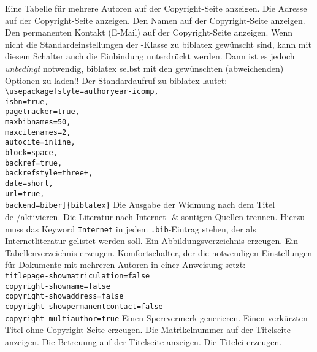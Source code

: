  Eine Tabelle \dfalse für mehrere Autoren auf der Copyright-Seite anzeigen.
 Die Adresse auf der Copyright-Seite anzeigen. \dtrue
{} Den Namen auf der Copyright-Seite anzeigen. \dtrue
{} Den permanenten Kontakt (E-Mail) auf der Copy\-right-Seite anzeigen. \dtrue
{} Wenn nicht \dfalse die Standardeinstellungen der \HSKLbook-Klasse zu biblatex gewünscht sind, kann mit diesem Schalter auch die Einbindung unterdrückt werden. Dann ist es jedoch \emph{unbedingt} notwendig, biblatex selbst mit den gewünschten (abweichenden) Optionen zu laden!! Der Standardaufruf zu biblatex lautet:\\\verb!\usepackage[style=authoryear-icomp,!\\\verb!isbn=true,!\\\verb!pagetracker=true,!\\\verb!maxbibnames=50,!\\\verb!maxcitenames=2,!\\\verb!autocite=inline,!\\\verb!block=space,!\\\verb!backref=true,!\\\verb!backrefstyle=three+,!\\\verb!date=short,!\\\verb!url=true,!\\\verb!backend=biber]{biblatex}!
 Die Ausgabe der Widmung nach dem Titel de-/aktivieren.\dtrue
{} Die \dfalse Literatur nach Internet- \& sontigen Quellen trennen. Hierzu muss das Keyword \verb!Internet! in jedem \verb!.bib!-Eintrag stehen, der als Internetliteratur gelistet werden soll.
 Ein Abbildungsverzeichnis erzeugen. \dtrue
{} Ein Tabellenverzeichnis erzeugen. \dtrue
{} Komfortschalter, \dfalse der die notwendigen Einstellungen für Dokumente mit mehreren Autoren in einer Anweisung setzt:\\\verb!titlepage-showmatriculation=false!\\\verb!copyright-showname=false!\\\verb!copyright-showaddress=false!\\\verb!copyright-showpermanentcontact=false!\\\verb!copyright-multiauthor=true!
 Einen Sperrvermerk generieren. \dfalse
{} Einen verkürzten Titel ohne Copyright-Seite erzeugen. \dfalse
{} Die Matrikelnummer auf der Titelseite anzeigen. \dtrue
{} Die Betreuung auf der Titelseite anzeigen. \dtrue
{} Die Titelei erzeugen. \dtrue
